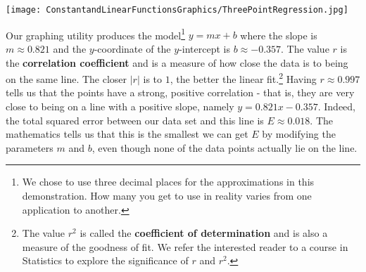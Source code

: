 \documentclass{ximera}
\begin{document}
\begin{center}

\texttt{[image: ConstantandLinearFunctionsGraphics/ThreePointRegression.jpg]}
\end{center}

Our graphing utility produces the model\footnote{We chose to use three decimal places for the approximations in this demonstration.  How many you get to use in reality varies from one application to another.} $y=mx+b$ where the slope is $m \approx 0.821$ and the $y$-coordinate of the $y$-intercept is $b \approx -0.357$.  The value $r$ is the \textbf{correlation coefficient} and is a measure of how close the data is to being on the same line.  The closer $|r|$ is to $1$, the better the linear fit.\footnote{The value $r^2$ is called the \textbf{coefficient of determination} and is also a measure of the goodness of fit. We refer the interested reader to a course in Statistics to explore the significance of $r$ and $r^2$.} Having $r \approx 0.997$ tells us that the points have a strong, positive correlation - that is, they are very close to being on a line with a positive slope, namely $y = 0.821x - 0.357$.   Indeed, the total squared error between our data set and this line is $E \approx 0.018$. The mathematics tells us that this is the smallest we can get $E$ by modifying the parameters $m$ and $b$, even though none of the data points actually lie on the line.  
\end{document}
